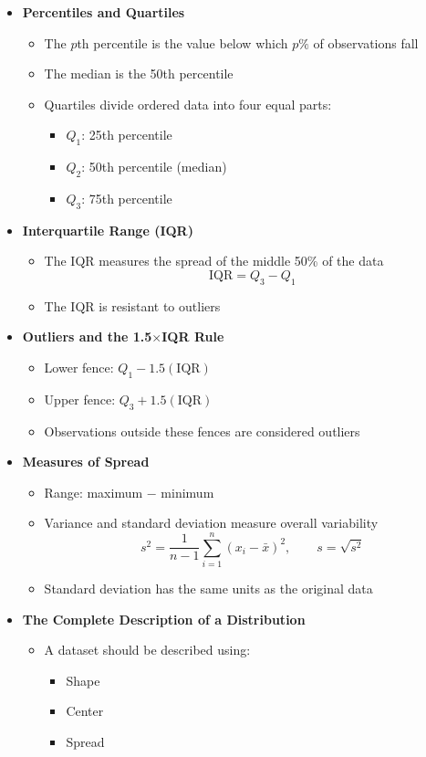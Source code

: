 \documentclass{article}
\begin{document}
\begin{itemize}
\item \textbf{Percentiles and Quartiles}
\begin{itemize}
  \item The $p$th percentile is the value below which $p\%$ of observations fall
  \item The median is the 50th percentile
  \item Quartiles divide ordered data into four equal parts:
  \begin{itemize}
    \item $Q_1$: 25th percentile
    \item $Q_2$: 50th percentile (median)
    \item $Q_3$: 75th percentile
  \end{itemize}
\end{itemize}

\item \textbf{Interquartile Range (IQR)}
\begin{itemize}
  \item The IQR measures the spread of the middle 50\% of the data
  \[
  \text{IQR} = Q_3 - Q_1
  \]
  \item The IQR is resistant to outliers
\end{itemize}

\item \textbf{Outliers and the 1.5$\times$IQR Rule}
\begin{itemize}
  \item Lower fence: $Q_1 - 1.5(\text{IQR})$
  \item Upper fence: $Q_3 + 1.5(\text{IQR})$
  \item Observations outside these fences are considered outliers
\end{itemize}

\item \textbf{Measures of Spread}
\begin{itemize}
  \item Range: maximum $-$ minimum
  \item Variance and standard deviation measure overall variability
  \[
  s^2 = \frac{1}{n-1}\sum_{i=1}^n (x_i-\bar{x})^2,
  \qquad
  s = \sqrt{s^2}
  \]
  \item Standard deviation has the same units as the original data
\end{itemize}

\item \textbf{The Complete Description of a Distribution}
\begin{itemize}
  \item A dataset should be described using:
  \begin{itemize}
    \item Shape
    \item Center
    \item Spread
  \end{itemize}
\end{itemize}

\end{itemize}
\end{document}
